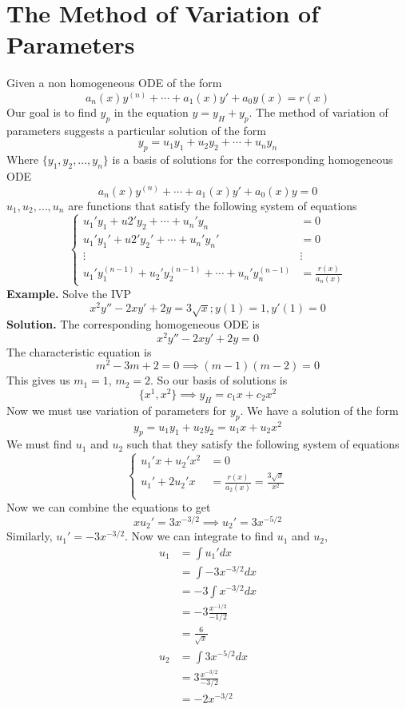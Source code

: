 \documentclass[openany]{report}
\begin{document}
\section{The Method of Variation of Parameters}
Given a non homogeneous ODE of the form
\[a_n(x)y^{(n)} + \cdots + a_1(x)y' + a_0y(x) = r(x)\]
Our goal is to find $y_p$ in the equation $y = y_H + y_p$. The method of variation of parameters suggests a particular solution of the form 
\[y_p = u_1y_1 + u_2y_2 + \cdots + u_ny_n\]
Where $\{y_1,y_2,\ldots,y_n\}$ is a basis of solutions for the corresponding homogeneous ODE 
\[a_n(x)y^{(n)} + \cdots + a_1(x)y' + a_0(x)y = 0\]
$u_1, u_2, \ldots, u_n$ are functions that satisfy the following system of equations 
\[\begin{cases}
    u_1'y_1 + u2'y_2 + \cdots + u_n'y_n & =0\\
    u_1'y_1' + u2'y_2' + \cdots + u_n'y_n' &= 0\\
    \vdots & \vdots\\
    u_1'y_1^{(n-1)} + u_2'y_2^{(n-1)} + \cdots + u_n'y_n ^{(n-1)} &= \frac{r(x)}{a_n(x)}
\end{cases}\]
\textbf{Example.} Solve the IVP 
\[x^2y'' - 2xy' + 2y = 3\sqrt{x}; y(1) = 1, y'(1) = 0\]
\textbf{Solution.} The corresponding homogeneous ODE is 
\[x^2y'' - 2xy' + 2y = 0\]
The characteristic equation is
\[m^2 - 3m + 2 = 0 \implies (m-1)(m-2)=0\]
This gives us $m_1 = 1$, $m_2 = 2$. So our basis of solutions is
\[\{x^1,x^2\} \implies y_H = c_1x + c_2x^2\]
Now we must use variation of parameters for $y_p$. We have a solution of the form 
\[y_p = u_1y_1 + u_2y_2 = u_1x + u_2x^2\]
We must find $u_1$ and $u_2$ such that they satisfy the following system of equations 
\[\begin{cases}
    u_1'x + u_2'x^2 &= 0\\
    u_1' + 2u_2'x &= \frac{r(x)}{a_2(x)} = \frac{3\sqrt{x}}{x^2}\\
\end{cases}\]
Now we can combine the equations to get
\[xu_2' = 3x^{-3/2} \implies u_2' = 3x^{-5/2}\]
Similarly, $u_1' = -3x^{-3/2}$. Now we can integrate to find $u_1$ and $u_2$, 
\begin{align*}
    u_1 &= \int u_1'dx\\
    &= \int -3x^{-3/2}dx\\
    &= -3 \int x^{-3/2}dx\\
    &= -3 \frac{x^{-1/2}}{-1/2}\\
    &= \frac{6}{\sqrt{x}}\\
    u_2 &= \int 3x^{-5/2}dx\\
    &= 3 \frac{x^{-3/2}}{-3/2}\\
    &= -2x^{-3/2}
\end{align*} 
\end{document}
